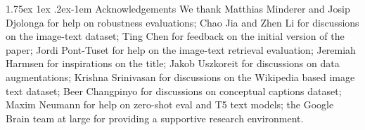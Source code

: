\documentclass[10pt,twocolumn,letterpaper]{article}
\makeatletter
\renewcommand{\paragraph}{%
  \@startsection{paragraph}{4}%
  {\z@}{1.75ex \@plus 1ex \@minus .2ex}{-1em}%
  {\normalfont\normalsize\bfseries}%
}
\makeatother
\begin{document}
\paragraph{Acknowledgements} 
We thank Matthias Minderer and Josip Djolonga for help on robustness evaluations; Chao Jia and Zhen Li for discussions on the image-text dataset; Ting Chen for feedback on the initial version of the paper; Jordi Pont-Tuset for help on the image-text retrieval evaluation; Jeremiah Harmsen for inspirations on the title; Jakob Uszkoreit for discussions on data augmentations; Krishna Srinivasan for discussions on the Wikipedia based image text dataset; Beer Changpinyo for discussions on conceptual captions dataset; Maxim Neumann for help on zero-shot eval and T5 text models; the Google Brain team at large for providing a supportive research environment.

{\small


}

\clearpage

\end{document}
